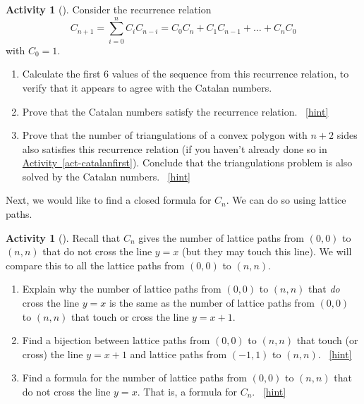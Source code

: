 \documentclass[10pt,]{book}
\theoremstyle{plain}
\theoremstyle{definition}
\theoremstyle{definition}
\theoremstyle{definition}
\newtheorem{activity}[project]{Activity}
\numberwithin{equation}{chapter}
\begin{document}
\begin{activity}[]\label{activity-119}
\hypertarget{p-590}{}%
Consider the recurrence relation%
\begin{equation*}
C_{n + 1} = \sum_{i = 0}^n C_iC_{n-i} = C_{0}C_{n} + C_{1}C_{n - 1} + \ldots + C_{n}C_{0}
\end{equation*}
with \(C_0 = 1\).%
\begin{enumerate}[font=\bfseries,label=(\alph*),ref=\alph*]
\item\label{task-120} \hypertarget{p-591}{}%
Calculate the first 6 values of the sequence from this recurrence relation, to verify that it appears to agree with the Catalan numbers.%
\item\label{task-121} \hypertarget{p-593}{}%
Prove that the Catalan numbers satisfy the recurrence relation.%
~\hfill{\tiny\hyperlink{a-119.b}{[hint]}\hypertarget{q-119.b}{}}\item\label{task-122} \hypertarget{p-598}{}%
Prove that the number of triangulations of a convex polygon with \(n+2\) sides also satisfies this recurrence relation (if you haven't already done so in \hyperref[act-catalanfirst]{Activity~\ref{act-catalanfirst}}).  Conclude that the triangulations problem is also solved by the Catalan numbers.%
~\hfill{\tiny\hyperlink{a-119.c}{[hint]}\hypertarget{q-119.c}{}}\end{enumerate}
\end{activity}
\hypertarget{p-601}{}%
Next, we would like to find a closed formula for \(C_n\).  We can do so using lattice paths.%
\begin{activity}[]\label{activity-120}
\hypertarget{p-602}{}%
Recall that \(C_n\) gives the number of lattice paths from \((0,0)\) to \((n,n)\) that do not cross the line \(y = x\) (but they may touch this line).  We will compare this to all the lattice paths from \((0,0)\) to \((n,n)\).%
\begin{enumerate}[font=\bfseries,label=(\alph*),ref=\alph*]
\item\label{task-123} \hypertarget{p-603}{}%
Explain why the number of lattice paths from \((0,0)\) to \((n,n)\) that \emph{do} cross the line \(y = x\) is the same as the number of lattice paths from \((0,0)\) to \((n,n)\) that touch or cross the line \(y = x + 1\).%
\item\label{task-124} \hypertarget{p-605}{}%
Find a bijection between lattice paths from \((0,0)\) to \((n,n)\) that touch (or cross) the line \(y=x+1\) and lattice paths from \((-1,1)\) to \((n,n)\).%
~\hfill{\tiny\hyperlink{a-120.b}{[hint]}\hypertarget{q-120.b}{}}\item\label{task-125} \hypertarget{p-608}{}%
Find a formula for the number of lattice paths from \((0,0)\) to \((n,n)\) that do not cross the line \(y=x\). That is, a formula for \(C_n\).%
~\hfill{\tiny\hyperlink{a-120.c}{[hint]}\hypertarget{q-120.c}{}}\end{enumerate}
\end{activity}
\end{document}
